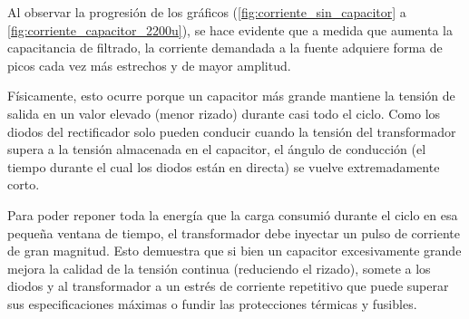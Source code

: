 \begin{tcolorbox}[colback=white, colframe=gray!50, title=Relación entre el filtrado y la corriente de fuente]
    Al observar la progresión de los gráficos (\ref{fig:corriente_sin_capacitor} a \ref{fig:corriente_capacitor_2200u}), se hace evidente que a medida que aumenta la capacitancia de filtrado, la corriente demandada a la fuente adquiere forma de picos cada vez más estrechos y de mayor amplitud.

    Físicamente, esto ocurre porque un capacitor más grande mantiene la tensión de salida en un valor elevado (menor rizado) durante casi todo el ciclo. Como los diodos del rectificador solo pueden conducir cuando la tensión del transformador supera a la tensión almacenada en el capacitor, el ángulo de conducción (el tiempo durante el cual los diodos están en directa) se vuelve extremadamente corto. 

    Para poder reponer toda la energía que la carga consumió durante el ciclo en esa pequeña ventana de tiempo, el transformador debe inyectar un pulso de corriente de gran magnitud. Esto demuestra que si bien un capacitor excesivamente grande mejora la calidad de la tensión continua (reduciendo el rizado), somete a los diodos y al transformador a un estrés de corriente repetitivo que puede superar sus especificaciones máximas o fundir las protecciones térmicas y fusibles.
\end{tcolorbox}